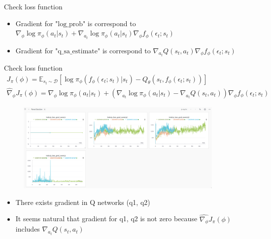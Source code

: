 \documentclass[8pt]{beamer}
\newcommand{\mbb}[1]{\mathbb{#1}}
\begin{document}
\begin{frame}{Check loss function}
    \begin{itemize}
        \item Gradient for $\text{"log\_prob"}$ is correspond to \(\nabla_\phi \log{\pi_\phi (a_t | s_t)} + \nabla_{a_t} \log{\pi_\phi (a_t|s_t)} \nabla_{\phi} f_\phi (\epsilon_t; s_t)  \)
        \item Gradient for  $\text{"q\_sa\_estimate"}$ is correspond to 
        \( \nabla_{a_t} Q(s_t, a_t) \nabla_\phi f_\phi (\epsilon_t; s_t) \)
    \end{itemize}
\end{frame}

\begin{frame}{Check loss function}
    \[
    \begin{gathered}
        J_\pi(\phi) = \mbb{E}_{s_t \sim \mathcal{D}} [\log{\pi_\phi (f_\phi (\epsilon_t;s_t)| s_t)} - Q_\theta (s_t, f_\phi (\epsilon_t; s_t))]\\
        \hat{\nabla}_\phi J_\pi (\phi) = \nabla_\phi \log{\pi_\phi (a_t|s_t)} + (\nabla_{a_t} \log{\pi_\phi (a_t|s_t)} - \nabla_{a_t} Q(s_t, a_t))\nabla_\phi f_\phi (\epsilon_t; s_t)
    \end{gathered}
    \]
    
    \begin{figure}
        \centering
        \includegraphics[width=0.9\textwidth]{fig9.png}
    \end{figure}

    \begin{itemize}
        \item There exists gradient in Q networks (q1, q2)
        \item It seems natural that gradient for q1, q2 is not zero because $\hat{\nabla_\phi} J_\pi (\phi)$ includes $\nabla_{a_t}Q(s_t, a_t)$
    \end{itemize}
\end{frame}
\end{document}
